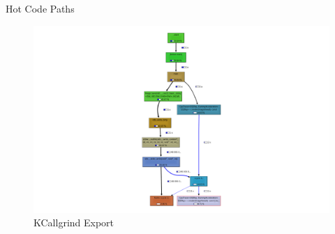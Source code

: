 	\begin{frame}{Hot Code Paths}
		\begin{figure}[ht]
        	\begin{minipage}[b]{0.7\linewidth}
            \centering
            \includegraphics[width=\textwidth]{images/callgrind2.png}
            \caption{KCallgrind Export}
            \label{fig:a}
        	\end{minipage}
	\end{figure}
	\end{frame}

